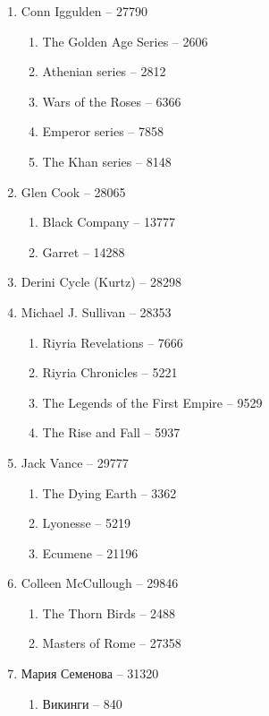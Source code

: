 \documentclass[a4paper, 11pt]{proc} %
\begin{document}
\begin{enumerate}
    \item Conn Iggulden -- 27790
        \begin{enumerate}
            \item The Golden Age Series -- 2606
            \item Athenian series -- 2812
            \item Wars of the Roses -- 6366
            \item Emperor series -- 7858
            \item The Khan series -- 8148
        \end{enumerate}
    \item Glen Cook -- 28065
        \begin{enumerate}
            \item Black Company -- 13777
            \item Garret -- 14288
        \end{enumerate}
    \item Derini Cycle (Kurtz) -- 28298
    \item Michael J. Sullivan -- 28353
        \begin{enumerate}
            \item Riyria Revelations -- 7666
            \item Riyria Chronicles -- 5221
            \item The Legends of the First Empire -- 9529
            \item The Rise and Fall -- 5937 
        \end{enumerate}
    \item Jack Vance -- 29777
        \begin{enumerate}
            \item The Dying Earth -- 3362
            \item Lyonesse -- 5219
            \item Ecumene -- 21196
        \end{enumerate}
    \item Colleen McCullough -- 29846
        \begin{enumerate}
            \item The Thorn Birds -- 2488
            \item Masters of Rome -- 27358
        \end{enumerate}
    \item Мария Семенова -- 31320
        \begin{enumerate}
            \item Викинги -- 840

\end{enumerate}
\end{enumerate}
\end{document}
